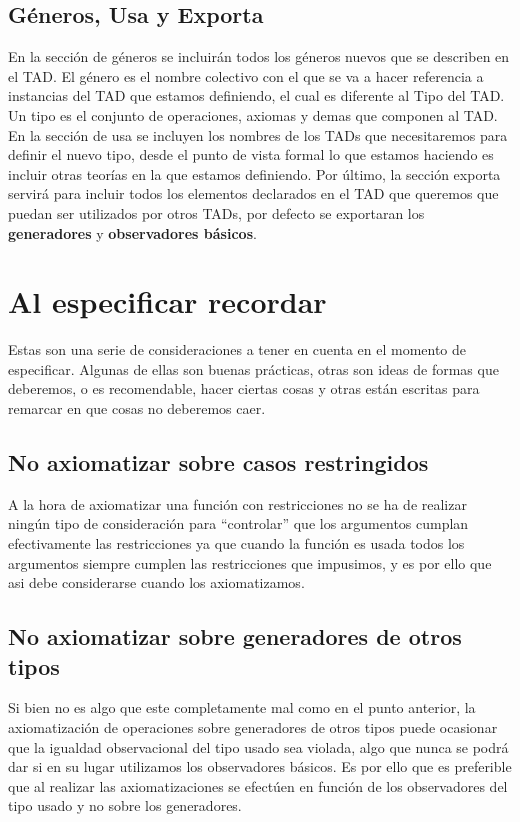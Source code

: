 \subsection{G\'eneros, Usa y Exporta}

En la secci\'on de g\'eneros se incluir\'an todos los g\'eneros nuevos que se describen en el TAD. El g\'enero es el nombre colectivo con el que se va a hacer referencia a instancias del TAD que estamos definiendo, el cual es diferente al Tipo del TAD. Un tipo es el conjunto de operaciones, axiomas y demas que componen al TAD. En la secci\'on de usa se incluyen los nombres de los TADs que necesitaremos para definir el nuevo tipo, desde el punto de vista formal lo que estamos haciendo es incluir otras teor\'ias en la que estamos definiendo. Por \'ultimo, la secci\'on exporta servir\'a para incluir todos los elementos declarados en el TAD que queremos que puedan ser utilizados por otros TADs, por defecto se exportaran los \textbf{generadores} y \textbf{observadores b\'asicos}.

\section{Al especificar recordar}

Estas son una serie de consideraciones a tener en cuenta en el momento de especificar. Algunas de ellas son buenas pr\'acticas, otras son ideas de formas que deberemos, o es recomendable, hacer ciertas cosas y otras est\'an escritas para remarcar en que cosas no deberemos caer.

\subsection{No axiomatizar sobre casos restringidos}

A la hora de axiomatizar una funci\'on con restricciones no se ha de realizar ning\'un tipo de consideraci\'on para ``controlar''  que los argumentos cumplan efectivamente las restricciones ya que cuando la funci\'on es usada todos los argumentos siempre cumplen las restricciones que impusimos, y es por ello que asi debe considerarse cuando los axiomatizamos.

\subsection{No axiomatizar sobre generadores de otros tipos}

Si bien no es algo que este completamente mal como en el punto anterior, la axiomatizaci\'on de operaciones sobre generadores de otros tipos puede ocasionar que la igualdad observacional del tipo usado sea violada, algo que nunca se podr\'a dar si en su lugar utilizamos los observadores b\'asicos. Es por ello que es preferible que al realizar las axiomatizaciones se efect\'uen en funci\'on de los observadores del tipo usado y no sobre los generadores.

